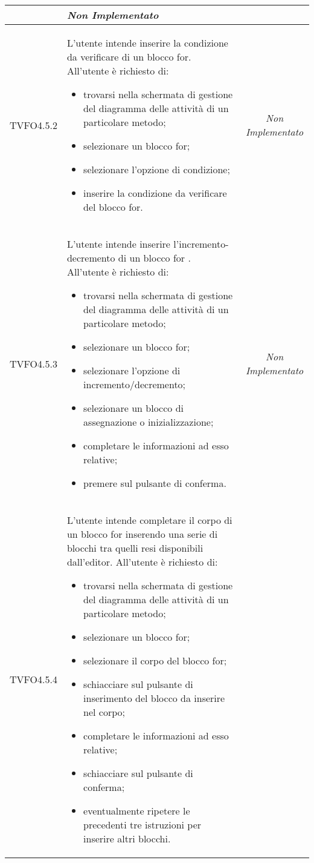 \begin{longtable}{|c|>{}m{8cm}|c|}
\begin{itemize}
\end{itemize} & \textit{Non Implementato}\\ \hline
\hypertarget{TVFO4.5.2}{TVFO4.5.2} & L'utente intende inserire la condizione da verificare di un blocco for.
All'utente è richiesto di:
\begin{itemize}
\item trovarsi nella schermata di gestione del diagramma delle attività di un particolare metodo;
\item selezionare un blocco for;
\item selezionare l'opzione di condizione;
\item inserire la condizione da verificare del blocco for.
\end{itemize} & \textit{Non Implementato}\\ \hline
\hypertarget{TVFO4.5.3}{TVFO4.5.3} & L'utente intende inserire l'incremento-decremento di un blocco for .
All'utente è richiesto di:
\begin{itemize}
\item trovarsi nella schermata di gestione del diagramma delle attività di un particolare metodo;
\item selezionare un blocco for;
\item selezionare l'opzione di incremento/decremento;
\item selezionare un blocco di assegnazione o inizializzazione;
\item completare le informazioni ad esso relative;
\item premere sul pulsante di conferma.
\end{itemize} & \textit{Non Implementato}\\ \hline
\hypertarget{TVFO4.5.4}{TVFO4.5.4} & L'utente intende completare il corpo di un blocco for inserendo una serie di blocchi tra quelli resi disponibili dall'editor.
All'utente è richiesto di:
\begin{itemize}
\item trovarsi nella schermata di gestione del diagramma delle attività di un particolare metodo;
\item selezionare un blocco for;
\item selezionare il corpo del blocco for;
\item schiacciare sul pulsante di inserimento del blocco da inserire nel corpo;
\item completare le informazioni ad esso relative;
\item schiacciare sul pulsante di conferma;
\item eventualmente ripetere le precedenti tre istruzioni per inserire altri blocchi.

\end{itemize}
\end{longtable}
